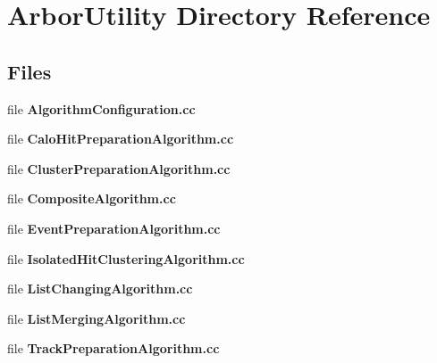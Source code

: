 \section{Arbor\+Utility Directory Reference}
\label{dir_7114a7249188be7f2b229cefeed146ec}
\subsection*{Files}
\begin{DoxyCompactItemize}
\item 
file {\bf Algorithm\+Configuration.\+cc}
\item 
file {\bf Calo\+Hit\+Preparation\+Algorithm.\+cc}
\item 
file {\bf Cluster\+Preparation\+Algorithm.\+cc}
\item 
file {\bf Composite\+Algorithm.\+cc}
\item 
file {\bf Event\+Preparation\+Algorithm.\+cc}
\item 
file {\bf Isolated\+Hit\+Clustering\+Algorithm.\+cc}
\item 
file {\bf List\+Changing\+Algorithm.\+cc}
\item 
file {\bf List\+Merging\+Algorithm.\+cc}
\item 
file {\bf Track\+Preparation\+Algorithm.\+cc}
\end{DoxyCompactItemize}
